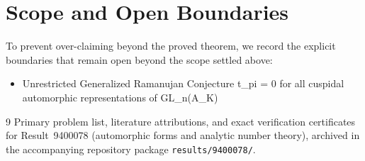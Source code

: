 \documentclass[10pt,reqno]{amsart}
\theoremstyle{definition}
\begin{document}
\section{Scope and Open Boundaries}

To prevent over-claiming beyond the proved theorem, we record the explicit boundaries that remain open beyond the scope settled above:
\begin{itemize}
  \item Unrestricted Generalized Ramanujan Conjecture t\_pi = 0 for all cuspidal automorphic representations of GL\_n(A\_K)
\end{itemize}

\begin{thebibliography}{9}
Primary problem list, literature attributions, and exact verification certificates for Result~9400078 (automorphic forms and analytic number theory), archived in the accompanying repository package \texttt{results/9400078/}.
\end{thebibliography}
\end{document}
